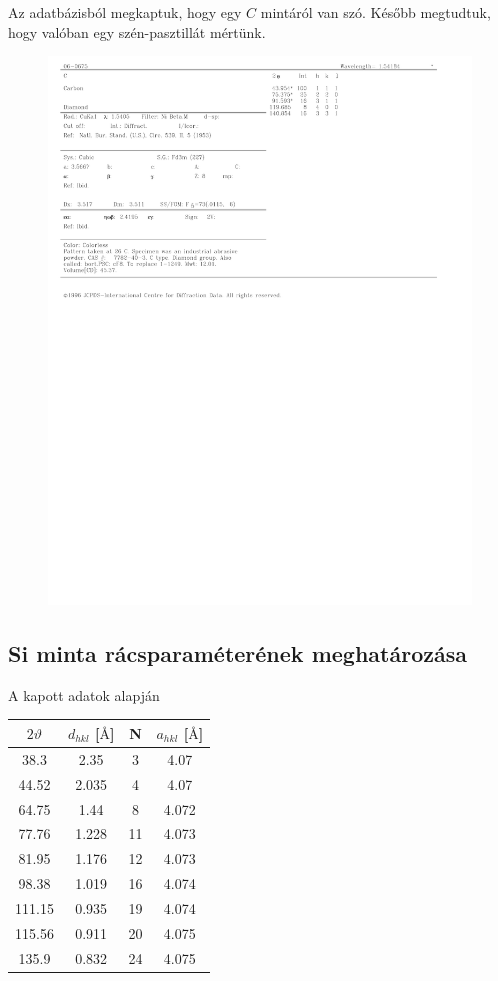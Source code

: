\documentclass[a4paper,12pt]{article}
\begin{document}
\par Az adatbázisból megkaptuk, hogy egy $C$ mintáról van szó. Később megtudtuk, hogy valóban egy szén-pasztillát mértünk.

\begin{figure}[H]
\centering
\includegraphics[width=.88\textwidth]{./maad.pdf}
\end{figure}

\subsection{ Si minta rácsparaméterének meghatározása}

\par A kapott adatok alapján 

\begin{center}
\begin{tabular}{|c|c|c|c|}
\hline
$2\vartheta$ & $d_{hkl}$ [$\si{\angstrom}$] & N & $a_{hkl}$ [$\si{\angstrom}$] \\
\hline
38.3 &2.35 & 3 & 4.07\\
\hline
44.52 & 2.035 & 4 & 4.07 \\
\hline
64.75 & 1.44 & 8 & 4.072\\
\hline
77.76 & 1.228 & 11 & 4.073\\
\hline
81.95 & 1.176 & 12 & 4.073 \\
\hline
98.38 & 1.019 & 16 & 4.074\\
\hline
111.15 & 0.935 & 19 & 4.074\\
\hline
115.56 & 0.911 & 20 & 4.075\\
\hline
135.9 & 0.832 & 24 & 4.075\\
\hline
\end{tabular}
\end{center}
\end{document}
